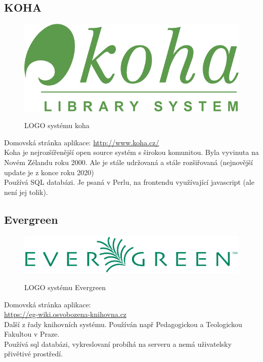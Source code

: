 \subsection{KOHA}
\begin{figure}
	\includegraphics[width=\linewidth]{img/KOHA_Logo.png}\\
	\caption[LOGO systému koha ze stránky \url{https://www.mainelibit.org/node/77}]{LOGO systému koha}
\end{figure}
Domovská stránka aplikace: \url{http://www.koha.cz/}\\
Koha je nejrozšířenější open source systém s širokou komunitou.
Byla vyvinuta na Novém Zélandu roku 2000.
Ale je stále udržovaná a stále rozšiřovaná
(nejnovější update je z konce roku 2020)
\\
Používá SQL databázi.
Je psaná v Perlu, na frontendu využívající javascript (ale není jej tolik).

\subsection{Evergreen}
\begin{figure}
	\centering
	\includegraphics[width=\linewidth]{img/Evergreen_Logo.png}\\
	\caption[LOGO systému Evergreen ze stránky \url{https://eg-wiki.osvobozena-knihovna.cz/}]{LOGO systému Evergreen}
\end{figure}
Domovská stránka aplikace: \\\url{https://eg-wiki.osvobozena-knihovna.cz}\\
Další z řady knihovních systému.
Používán např Pedagogickou a Teologickou Fakultou v Praze.\\
Používá sql databázi, vykreslovaní probíhá na serveru a nemá uživatelsky přivětivé prostředí.


